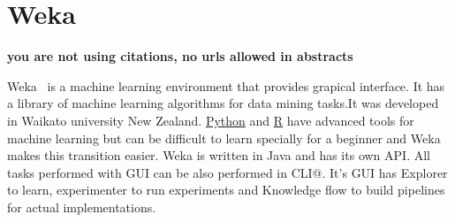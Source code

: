 \section{Weka}

{\bf you are not using citations, no urls allowed in abstracts}

Weka~\cite{hid-sp18-413-weka} is a machine learning environment that
provides grapical interface. It has a library of machine learning
algorithms for data mining tasks.It was developed in Waikato
university New Zealand. \href{https://en.wikipedia.org/wiki/Python_s
  (programming_language)}{Python} and
\href{https://en.wikipedia.org/wiki/R_s (programming_language)}{R}
have advanced tools for machine learning but can be difficult to learn
specially for a beginner and Weka makes this transition easier. Weka
is written in Java and has its own API\@. All tasks performed with GUI
can be also performed in CLI@\@. It's GUI has Explorer to learn,
experimenter to run experiments and Knowledge flow to build pipelines
for actual implementations.
